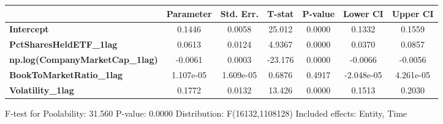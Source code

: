 \begin{center}
\begin{tabular}{lclc}
\bottomrule
\end{tabular}
\begin{tabular}{lcccccc}
                                        & \textbf{Parameter} & \textbf{Std. Err.} & \textbf{T-stat} & \textbf{P-value} & \textbf{Lower CI} & \textbf{Upper CI}  \\
\midrule
\textbf{Intercept}                      &       0.1446       &       0.0058       &      25.012     &      0.0000      &       0.1332      &       0.1559       \\
\textbf{PctSharesHeldETF\_1lag}         &       0.0613       &       0.0124       &      4.9367     &      0.0000      &       0.0370      &       0.0857       \\
\textbf{np.log(CompanyMarketCap\_1lag)} &      -0.0061       &       0.0003       &     -23.176     &      0.0000      &      -0.0066      &      -0.0056       \\
\textbf{BookToMarketRatio\_1lag}        &     1.107e-05      &     1.609e-05      &      0.6876     &      0.4917      &     -2.048e-05    &     4.261e-05      \\
\textbf{Volatility\_1lag}               &       0.1772       &       0.0132       &      13.426     &      0.0000      &       0.1513      &       0.2030       \\
\bottomrule
\end{tabular}
\end{center}

F-test for Poolability: 31.560 \newline
 P-value: 0.0000 \newline
 Distribution: F(16132,1108128) \newline
  \newline
 Included effects: Entity, Time
